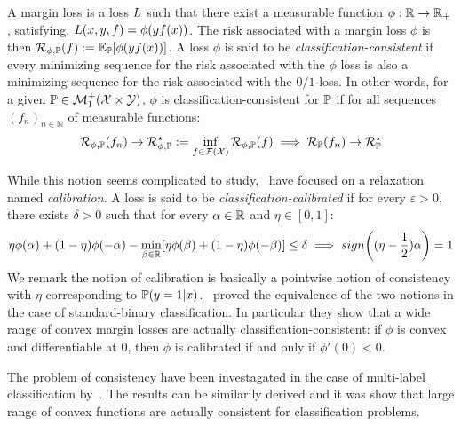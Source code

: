A margin loss is a loss $L$ such that there exist a measurable function $\phi:\mathbb{R}\to\mathbb{R}_+$, satisfying, $L(x,y,f) =\phi(yf(x))$. The risk associated with a margin loss $\phi$ is then $\risk_{\phi,\PP}(f):=\mathbb{E}_\PP\left[\phi(yf(x))\right]$. A loss $\phi$ is said to be \emph{classification-consistent} if every minimizing sequence for the risk associated with the $\phi$ loss is also a minimizing sequence for the risk associated with the $0/1$-loss. In other words, for a given $\mathbb{P}\in\mathcal{M}_1^+(\mathcal{X}\times\mathcal{Y})$, $\phi$ is classification-consistent for $\mathbb{P}$ if for all sequences $(f_n)_{n\in\mathbb{N}}$ of measurable functions:
\begin{align}
    \mathcal{R}_{\phi,\mathbb{P}}(f_n)\to \mathcal{R}_{\phi,\mathbb{P}}^\star:=\inf_{f\in\mathcal{F}(\mathcal{X})}\mathcal{R}_{\phi,\mathbb{P}}(f)\implies\mathcal{R}_{\mathbb{P}}(f_n)\to \mathcal{R}_{\mathbb{P}}^\star
\end{align}

 While this notion seems complicated to study,~\cite{zhang2004statistical,bartlett2006convexity,steinwart2007compare} have focused on a relaxation named \emph{calibration}. A loss is said to be \emph{classification-calibrated} if for every $\varepsilon>0$, there exists $\delta>0$ such that for every $\alpha\in\mathbb{R}$ and $\eta\in[0,1]$:
\begin{align*}
    \eta\phi(\alpha)+(1-\eta)\phi(-\alpha)-\min_{\beta\in\RR}\left[ \eta\phi(\beta)+(1-\eta)\phi(-\beta)\right]\leq \delta\implies sign\left((\eta-\frac12)\alpha\right)=1
\end{align*}
We remark the notion of calibration is basically a pointwise notion of consistency with $\eta$ corresponding to $\mathbb{P}(y=1|x)$.~\cite{zhang2004statistical,bartlett2006convexity,steinwart2007compare} proved the equivalence of the two notions in the case of standard-binary classification. In particular they show that a wide range of convex margin losses are actually classification-consistent: if $\phi$ is convex and differentiable at $0$, then $\phi$ is calibrated if and only if $\phi'(0)<0$.


The problem of consistency have been investagated in the case of multi-label classification by~\cite{zhang2004multi}. The results can be similarily derived and it was show that large range of convex functions are actually consistent for classification problems.




